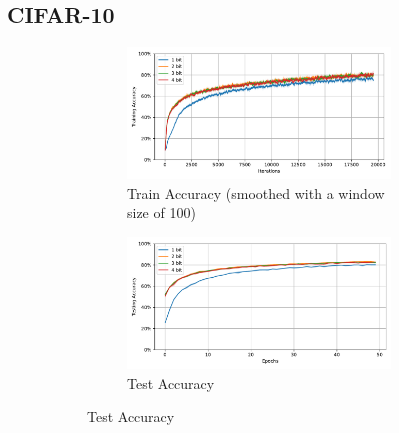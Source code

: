     \subsection{CIFAR-10}
    \label{appendix:accuracy_curves_cifar10}
        \begin{figure}[H]
            \centering
            \begin{subfigure}[H]{0.69\textwidth}
                \centering
                \begin{subfigure}[H]{\textwidth}
                    \centering
                    \includegraphics[width=\textwidth]{../standard/CIFAR10/plots/cifar10_train_acc.pdf}
                    \caption{Train Accuracy (smoothed with a window size of 100)}
                \end{subfigure}
                \hfill
                \begin{subfigure}[H]{\textwidth}
                    \centering
                    \includegraphics[width=\textwidth]{../standard/CIFAR10/plots/cifar10_test_acc.pdf}
                    \caption{Test Accuracy}
                \end{subfigure}
            \end{subfigure}
            \hfill
            \begin{subfigure}[H]{0.3\textwidth}

\end{subfigure}
\end{figure}
